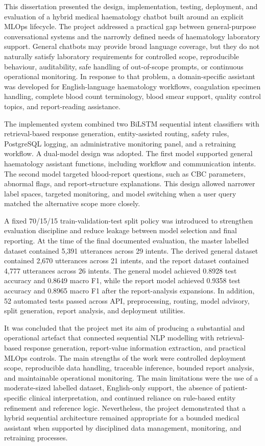 This dissertation presented the design, implementation, testing, deployment, and evaluation of a hybrid medical haematology chatbot built around an explicit MLOps lifecycle. The project addressed a practical gap between general-purpose conversational systems and the narrowly defined needs of haematology laboratory support. General chatbots may provide broad language coverage, but they do not naturally satisfy laboratory requirements for controlled scope, reproducible behaviour, auditability, safe handling of out-of-scope prompts, or continuous operational monitoring. In response to that problem, a domain-specific assistant was developed for English-language haematology workflows, coagulation specimen handling, complete blood count terminology, blood smear support, quality control topics, and report-reading assistance.

The implemented system combined two BiLSTM sequential intent classifiers with retrieval-based response generation, entity-assisted routing, safety rules, PostgreSQL logging, an administrative monitoring panel, and a retraining workflow. A dual-model design was adopted. The first model supported general haematology assistant functions, including workflow and communication intents. The second model targeted blood-report questions, such as CBC parameters, abnormal flags, and report-structure explanations. This design allowed narrower label spaces, targeted monitoring, and model switching when a user query matched the alternative scope more closely.

A fixed 70/15/15 train-validation-test split policy was introduced to strengthen evaluation discipline and reduce leakage between model selection and final reporting. At the time of the final documented evaluation, the master labelled dataset contained 5,391 utterances across 29 intents. The derived general dataset contained 2,670 utterances across 21 intents, and the report dataset contained 4,777 utterances across 26 intents. The general model achieved 0.8928 test accuracy and 0.8649 macro F1, while the report model achieved 0.9358 test accuracy and 0.8965 macro F1 after the report-analysis expansions. In addition, 52 automated tests passed across API, preprocessing, routing, model advisory, split generation, report analysis, and deployment utilities.

It was concluded that the project met its aim of producing a substantial and operational artefact that connected sequential NLP modelling with retrieval-based response generation, report-value information extraction, and practical MLOps controls. The main strengths of the work were controlled deployment scope, reproducible data handling, traceable inference, bounded report analysis, and maintainable operational monitoring. The main limitations were the use of a moderate-sized labelled dataset, English-only support, the absence of patient-specific clinical interpretation, and continued reliance on rule-based entity refinement and reference logic. Nevertheless, the project demonstrated that a hybrid sequential architecture remained appropriate for a bounded medical assistant when supported by disciplined data management, monitoring, and retraining processes.
